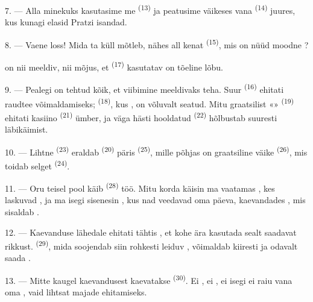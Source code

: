 7. --- Alla minekuks kasutasime me  \textsuperscript{(13)} ja
peatusime väikeses  vana  
\textsuperscript{(14)} juures, kus kunagi elasid Pratzi isandad.

8. --- Vaene loss! Mida ta küll mõtleb, nähes all kenat 
\textsuperscript{(15)}, mis on nüüd moodne ?

 on nii meeldiv,  nii mõjus, et
 \textsuperscript{(17)} kasutatav  on tõeline
lõbu.

\VUsaut{3.0mm}
\VUsaut{3.0mm}

9. --- Pealegi on tehtud kõik, et viibimine meeldivaks teha. Suur 
\textsuperscript{(16)} ehitati raudtee võimaldamiseks; 
 \textsuperscript{(18)}, kus , on võluvalt
seatud. Mitu graatsilist «» \textsuperscript{(19)} ehitati kasiino
\textsuperscript{(21)} ümber, ja väga hästi hooldatud 
\textsuperscript{(22)} hõlbustab suuresti läbikäimist.

10. --- Lihtne  \textsuperscript{(23)} eraldab 
\textsuperscript{(20)} päris  \textsuperscript{(25)}, mille põhjas on
graatsiline väike  \textsuperscript{(26)}, mis toidab selget 
\textsuperscript{(24)}.

11. --- Oru teisel pool käib  \textsuperscript{(28)} töö. Mitu
korda käisin ma vaatamas , kes laskuvad , ja ma isegi
sisenesin , kus nad veedavad oma päeva, kaevandades , mis
sisaldab .

12. --- Kaevanduse lähedale ehitati tähtis , et kohe ära kasutada
sealt saadavat rikkust.  \textsuperscript{(29)}, mida soojendab siin
rohkesti leiduv , võimaldab kiiresti ja odavalt saada .

13. --- Mitte kaugel kaevandusest kaevatakse  \textsuperscript{(30)}.
Ei , ei , ei isegi  ei raiu vana
 oma , vaid lihtsat  majade
ehitamiseks.

